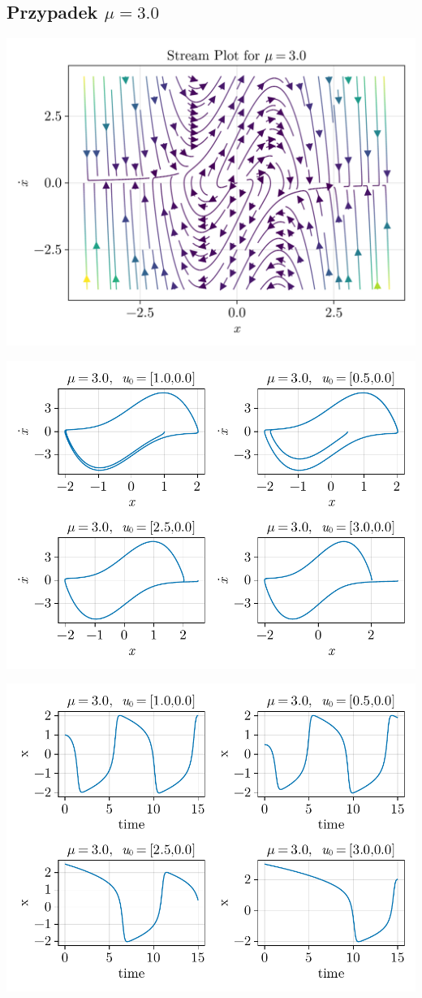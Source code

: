 \clearpage

%
%
\subsection{Przypadek $\mu = 3.0$}
\includegraphics[width=\textwidth]{out/stream_10.png}

\includegraphics[width=\textwidth]{out/phase_10.pdf}

\includegraphics[width=\textwidth]{out/xfromt_10.pdf}

